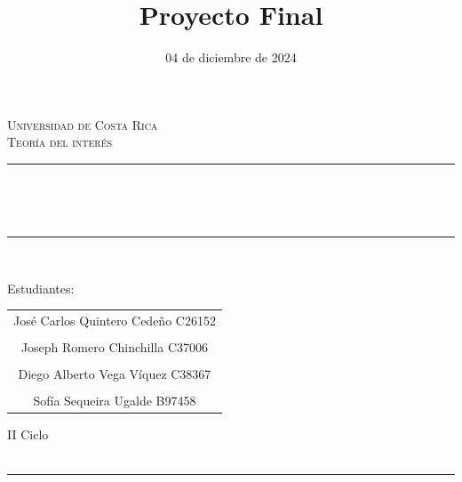 \documentclass[12pt]{article}
\title{Proyecto Final}
\date{04 de diciembre de 2024}						%
\makeatletter
\let\thetitle\@title
\let\thedate\@date
\newcommand{\EstudianteUno}{José Carlos Quintero Cedeño C26152}
\newcommand{\EstudianteDos}{Joseph Romero Chinchilla C37006}
\newcommand{\EstudianteTres}{Diego Alberto Vega Víquez C38367}
\newcommand{\EstudianteCuatro}{Sofía Sequeira Ugalde B97458}
\makeatother
\begin{document}

\begin{titlepage}
	\centering
    \vspace*{0.0 cm}
    
    \textsc{\LARGE Universidad de Costa Rica}\\[1.0 cm]	%
	\textsc{\Large Teoría del interés}\\[0.5 cm]				%
	\rule{\linewidth}{0.2 mm} \\[0.4 cm]

    \begin{spacing}{1.5}
        {\huge \bfseries \thetitle}\\
    \end{spacing}

	\rule{\linewidth}{0.2 mm} \\[1.5 cm]

    \vfill
    \begin{center}
      \large Estudiantes:%
      \linebreak %
      \linebreak %
      \begin{tabular}{c}
        \large \EstudianteUno  \\ \\
        \large \EstudianteDos  \\ \\
        \large \EstudianteTres  \\ \\
        \large \EstudianteCuatro 
      \end{tabular}
    \end{center}

    \vfill
	{\Large II Ciclo} \\[0.5 cm]
	{\large \thedate}\\[2 cm]
 
	\vfill
	
\end{titlepage}



\renewcommand{\contentsname}{\centering \textbf{Tabla de Contenidos}}

\thispagestyle{empty}
\rule{\linewidth}{0.2 mm} 
\tableofcontents %
\end{document}
